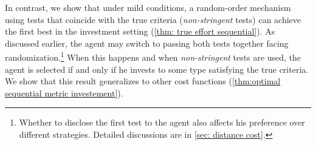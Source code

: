  



 In contrast,  we show that under mild conditions, a random-order mechanism using  tests that coincide with the true criteria (\emph{non-stringent} tests) can achieve the first best in the investment setting (\cref{thm: true effort sequential}).
As discussed earlier, the agent may switch to passing both tests together facing randomization.\footnote{Whether to disclose the first test to the agent also affects his preference over different strategies. Detailed discussions are in \cref{sec: distance cost}.}
When this happens and when \emph{non-stringent} tests are used, the agent is selected if and only if he invests to some type satisfying the true criteria.
We show that this result generalizes to other cost functions (\cref{thm:optimal sequential metric investement}).


